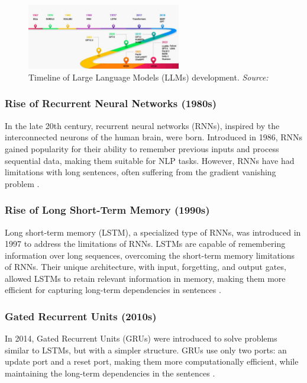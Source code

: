 \begin{figure}[h!]
    \centering
    \includegraphics[width=0.6\textwidth]{images/llms/llms-history.png}
    \caption{Timeline of Large Language Models (LLMs) development. \textit{Source:} \cite{AnalyticsVidhya2023}}
    \label{fig:llms-history}
\end{figure}

\subsubsection{Rise of Recurrent Neural Networks (1980s)}

In the late 20th century, recurrent neural networks (RNNs), inspired by the interconnected neurons of the human brain, were born. Introduced in 1986, RNNs gained popularity for their ability to remember previous inputs and process sequential data, making them suitable for NLP tasks. However, RNNs have had limitations with long sentences, often suffering from the gradient vanishing problem \cite{elman1990finding}.

\subsubsection{Rise of Long Short-Term Memory (1990s)}

Long short-term memory (LSTM), a specialized type of RNNs, was introduced in 1997 to address the limitations of RNNs. LSTMs are capable of remembering information over long sequences, overcoming the short-term memory limitations of RNNs. Their unique architecture, with input, forgetting, and output gates, allowed LSTMs to retain relevant information in memory, making them more efficient for capturing long-term dependencies in sentences \cite{hochreiter1997long}.

\subsubsection{Gated Recurrent Units (2010s)}

In 2014, Gated Recurrent Units (GRUs) were introduced to solve problems similar to LSTMs, but with a simpler structure. GRUs use only two ports: an update port and a reset port, making them more computationally efficient, while maintaining the long-term dependencies in the sentences \cite{cho2014learning}.

